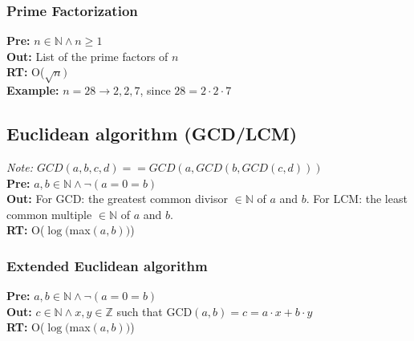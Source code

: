 \documentclass[a4paper,10pt]{article}
\newcommand{\N}{\mathbb{N}}
\newcommand{\Z}{\mathbb{Z}}
\begin{document}
\begin{multicols}{2}
\subsubsection{Prime Factorization}
\textbf{Pre:} $n\in\N\land n\geq1$ \\
\textbf{Out:} List of the prime factors of $n$\\
\textbf{RT:} O($\sqrt{n})$\\
\textbf{Example:} $n=28\rightarrow 2,2,7$, since $28=2\cdot2\cdot7$ 


\subsection{Euclidean algorithm (GCD/LCM)}
\textit{Note: $GCD(a, b, c, d) == GCD(a, GCD(b, GCD(c,d)))$}\\
\textbf{Pre:} $a,b\in\N\land \lnot(a=0=b)$\\
\textbf{Out:} For GCD: the greatest common divisor $\in\N$ of $a$ and $b$. For LCM: the least common multiple $\in\N$ of $a$ and $b$.\\
\textbf{RT:} O($\log($max$(a,b))$)


\subsubsection{Extended Euclidean algorithm}
\textbf{Pre:} $a,b\in\N\land \lnot(a=0=b)$\\
\textbf{Out:} $c\in\N\land x,y\in\Z$ such that GCD$(a,b)=c=a\cdot x+b\cdot y$\\
\textbf{RT:} O($\log($max$(a,b))$)



\end{multicols}
\end{document}
